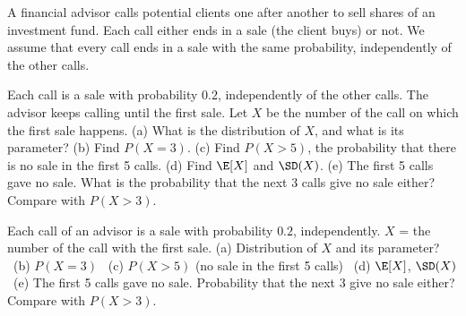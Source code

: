 
\begin{problem}
	\begin{context}
		A financial advisor calls potential clients one after another to sell
		shares of an investment fund. Each call either ends in a sale (the client
		buys) or not. We assume that every call ends in a sale with the same
		probability, independently of the other calls.
	\end{context}
	Each call is a sale with probability $0.2$, independently of the other
	calls. The advisor keeps calling until the first sale. Let $X$ be the number
	of the call on which the first sale happens.
	(a) What is the distribution of $X$, and what is its parameter?
	(b) Find $P(X=3)$.
	(c) Find $P(X>5)$, the probability that there is no sale in the first 5
	calls.
	(d) Find $\E[X]$ and $\SD(X)$.
	(e) The first 5 calls gave no sale. What is the probability that the next
	3 calls give no sale either? Compare with $P(X>3)$.
\end{problem}

\begin{slideproblem}
	Each call of an advisor is a sale with probability $0.2$, independently.
	$X$ = the number of the call with the first sale.
	(a) Distribution of $X$ and its parameter? \ (b) $P(X=3)$ \
	(c) $P(X>5)$ (no sale in the first 5 calls) \ (d) $\E[X]$, $\SD(X)$ \
	(e) The first 5 calls gave no sale. Probability that the next 3 give no
	sale either? Compare with $P(X>3)$.
\end{slideproblem}

